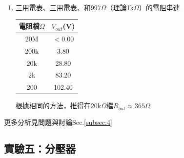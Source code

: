 \documentclass[12pt,a4paper]{article}
\begin{document}
\begin{CJK}{UTF8}{bkai}
\begin{enumerate}
    \item 三用電表、三用電表、和997$\Omega$（理論1k$\Omega$）的電阻串連\\
    \begin{center}
    \begin{tabular}{c|c}
    \hline
    電阻檔$\Omega$    &   $V_{out}$(V)\\
    \hline
    \hline
    20M &   $<$0.00\\\hline
    200k    &   3.80\\\hline
    20k &   28.80\\\hline
    2k  &   83.20\\\hline
    200 &   102.40\\\hline
    \end{tabular}
    \end{center}
    根據相同的方法，推得在20k$\Omega$檔$R_{out}\approx365\Omega$
\end{enumerate}
更多分析見問題與討論Sec.\ref{subsec:4}


\subsection{實驗五：分壓器}
\hfill


\end{CJK}
\end{document}
